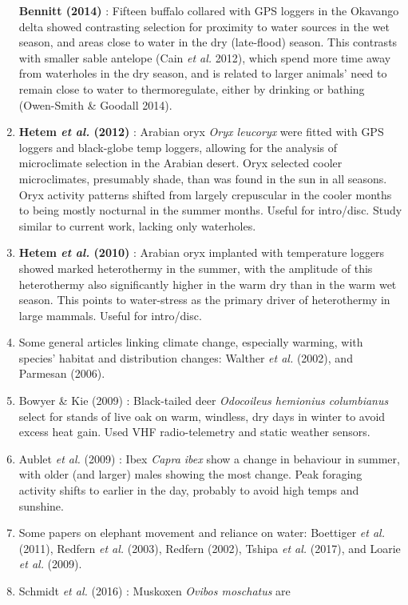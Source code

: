 \documentclass[10pt,twocolumn]{paper}
\begin{document}
\begin{enumerate}
  \textbf{Bennitt (2014)} : Fifteen buffalo collared with GPS loggers in
  the Okavango delta showed contrasting selection for proximity to water
  sources in the wet season, and areas close to water in the dry
  (late-flood) season. This contrasts with smaller sable antelope (Cain
  \emph{et al.} 2012), which spend more time away from waterholes in the
  dry season, and is related to larger animals' need to remain close to
  water to thermoregulate, either by drinking or bathing (Owen-Smith \&
  Goodall 2014).
\item
  \textbf{Hetem \emph{et al.} (2012)} : Arabian oryx \emph{Oryx
  leucoryx} were fitted with GPS loggers and black-globe temp loggers,
  allowing for the analysis of microclimate selection in the Arabian
  desert. Oryx selected cooler microclimates, presumably shade, than was
  found in the sun in all seasons. Oryx activity patterns shifted from
  largely crepuscular in the cooler months to being mostly nocturnal in
  the summer months. Useful for intro/disc. Study similar to current
  work, lacking only waterholes.
\item
  \textbf{Hetem \emph{et al.} (2010)} : Arabian oryx implanted with
  temperature loggers showed marked heterothermy in the summer, with the
  amplitude of this heterothermy also significantly higher in the warm
  dry than in the warm wet season. This points to water-stress as the
  primary driver of heterothermy in large mammals. Useful for
  intro/disc.
\item
  Some general articles linking climate change, especially warming, with
  species' habitat and distribution changes: Walther \emph{et al.}
  (2002), and Parmesan (2006).
\item
  Bowyer \& Kie (2009) : Black-tailed deer \emph{Odocoileus hemionius
  columbianus} select for stands of live oak on warm, windless, dry days
  in winter to avoid excess heat gain. Used VHF radio-telemetry and
  static weather sensors.
\item
  Aublet \emph{et al.} (2009) : Ibex \emph{Capra ibex} show a change in
  behaviour in summer, with older (and larger) males showing the most
  change. Peak foraging activity shifts to earlier in the day, probably
  to avoid high temps and sunshine.
\item
  Some papers on elephant movement and reliance on water: Boettiger
  \emph{et al.} (2011), Redfern \emph{et al.} (2003), Redfern (2002),
  Tshipa \emph{et al.} (2017), and Loarie \emph{et al.} (2009).
\item
  Schmidt \emph{et al.} (2016) : Muskoxen \emph{Ovibos moschatus} are

\end{enumerate}
\end{document}
